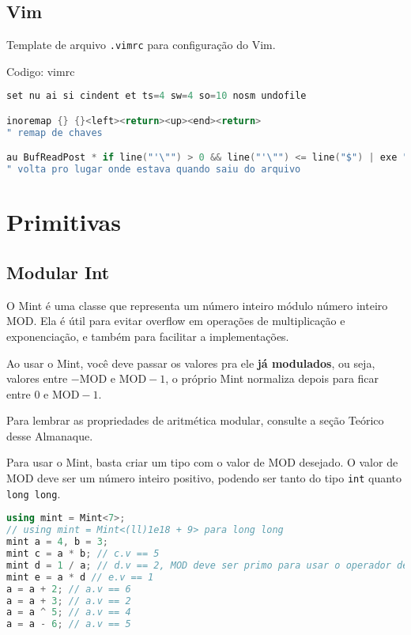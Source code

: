 \documentclass[10pt, a4paper, oneside]{book}
\begin{document}
\section{Vim}


Template de arquivo \texttt{.vimrc} para configuração do Vim.

\hfill

Codigo: vimrc

\begin{lstlisting}[language=C++]
set nu ai si cindent et ts=4 sw=4 so=10 nosm undofile

inoremap {} {}<left><return><up><end><return>
" remap de chaves

au BufReadPost * if line("'\"") > 0 && line("'\"") <= line("$") | exe "normal! g'\"" | endif
" volta pro lugar onde estava quando saiu do arquivo
\end{lstlisting}
\hfill

\newpage

%
%
%
%

\chapter{Primitivas}

\section{Modular Int}


O Mint é uma classe que representa um número inteiro módulo número inteiro $\text{MOD}$. Ela é útil para evitar overflow em operações de multiplicação e exponenciação, e também para facilitar a implementações.



Ao usar o Mint, você deve passar os valores pra ele \textbf{já modulados}, ou seja, valores entre $-\text{MOD}$ e $\text{MOD}-1$, o próprio Mint normaliza depois para ficar entre $0$ e $\text{MOD}-1$.



Para lembrar as propriedades de aritmética modular, consulte a seção Teórico desse Almanaque.



Para usar o Mint, basta criar um tipo com o valor de $\text{MOD}$ desejado. O valor de $\text{MOD}$ deve ser um número inteiro positivo, podendo ser tanto do tipo \texttt{int} quanto \texttt{long long}.



\begin{lstlisting}[language=C++]
using mint = Mint<7>;
// using mint = Mint<(ll)1e18 + 9> para long long
mint a = 4, b = 3;
mint c = a * b; // c.v == 5
mint d = 1 / a; // d.v == 2, MOD deve ser primo para usar o operador de divisão
mint e = a * d // e.v == 1
a = a + 2; // a.v == 6
a = a + 3; // a.v == 2
a = a ^ 5; // a.v == 4
a = a - 6; // a.v == 5
\end{lstlisting}
\end{document}
